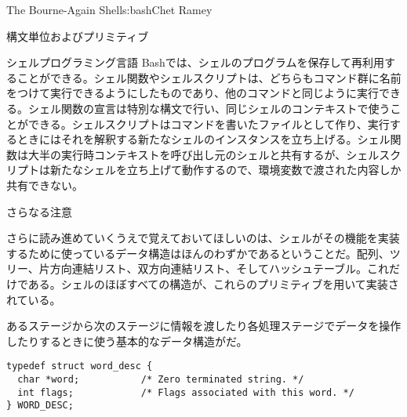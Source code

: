 \begin{aosachapter}{The Bourne-Again Shell}{s:bash}{Chet Ramey}
\begin{aosasect1}{構文単位およびプリミティブ}
\begin{aosasect2}{シェルプログラミング言語}
Bashでは、シェルのプログラムを保存して再利用することができる。シェル関数やシェルスクリプトは、どちらもコマンド群に名前をつけて実行できるようにしたものであり、他のコマンドと同じように実行できる。シェル関数の宣言は特別な構文で行い、同じシェルのコンテキストで使うことができる。シェルスクリプトはコマンドを書いたファイルとして作り、実行するときにはそれを解釈する新たなシェルのインスタンスを立ち上げる。シェル関数は大半の実行時コンテキストを呼び出し元のシェルと共有するが、シェルスクリプトは新たなシェルを立ち上げて動作するので、環境変数で渡された内容しか共有できない。

\end{aosasect2}

\begin{aosasect2}{さらなる注意}

さらに読み進めていくうえで覚えておいてほしいのは、シェルがその機能を実装するために使っているデータ構造はほんのわずかであるということだ。配列、ツリー、片方向連結リスト、双方向連結リスト、そしてハッシュテーブル。これだけである。シェルのほぼすべての構造が、これらのプリミティブを用いて実装されている。

あるステージから次のステージに情報を渡したり各処理ステージでデータを操作したりするときに使う基本的なデータ構造がだ。

\begin{verbatim}
typedef struct word_desc {
  char *word;           /* Zero terminated string. */
  int flags;            /* Flags associated with this word. */
} WORD_DESC;
\end{verbatim}


\end{aosasect2}
\end{aosasect1}
\end{aosachapter}

